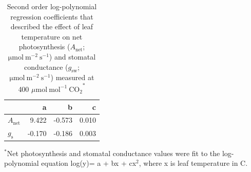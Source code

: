 \newpage
\begin{table}[]
    \centering
    \caption[Second order log-polynomial regression coefficients that described the effect of leaf temperature on net photosynthesis and stomatal conductance measured at 400 $\mu \mathrm{mol\ mol^{-1}\ CO_2}$]{Second order log-polynomial regression coefficients that described the effect of leaf temperature on net photosynthesis ($A_\mathrm{net}$; $\mathrm{\mu mol\ m^{-2}\ s^{-1}}$) and stomatal conductance ($g_\mathrm{sw}$; $\mathrm{\mu mol\ m^{-2}\ s^{-1}}$) measured at 400 $\mu \mathrm{mol\ mol^{-1}\ CO_2}^*$}
    \label{table:tab.b3}
    \begin{tabular}{p{2cm}p{3cm}p{3cm}p{}}  
        \hline
                            & \multicolumn{1}{r}{a}      & \multicolumn{1}{r}{b}      & \multicolumn{1}{r}{c}     \\
        \hline
        $A_\mathrm{net}$    & \multicolumn{1}{r}{9.422}  & \multicolumn{1}{r}{-0.573} & \multicolumn{1}{r}{0.010} \\
        $g_\mathrm{s}$      & \multicolumn{1}{r}{-0.170} & \multicolumn{1}{r}{-0.186} & \multicolumn{1}{r}{0.003}
\end{tabular}%
\end{table}
\begin{singlespace}
    \noindent $^*$Net photosynthesis and stomatal conductance values were fit to the log-polynomial equation log(y)= a + bx + cx$^2$, where x is leaf temperature in \textdegree{}C.
\end{singlespace}
\clearpage

